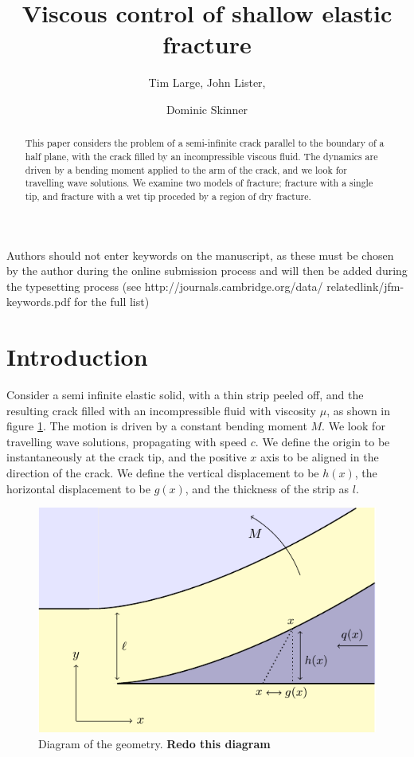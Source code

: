 \documentclass{jfm}
\title{Viscous control of shallow elastic fracture}
\author{Tim Large\aff{1},
  John Lister\aff{2},
 \and Dominic Skinner\aff{2}}
\affiliation{\aff{1} Massachusetts Institute of Technology, USA
\aff{2}Department of Applied Mathematics and Theoretical Physics, University of
Cambridge, UK}
\begin{document}
\maketitle

\begin{abstract}
This paper considers the problem of a semi-infinite crack parallel to the
boundary of a half plane, with the crack filled by an incompressible viscous
fluid. 
The dynamics are driven by a bending moment applied to the arm of the crack,
and we look for travelling wave solutions. We examine two models of fracture;
fracture with a single tip, and fracture with a wet tip proceded by a region
of dry fracture.
\end{abstract}

\begin{keywords}
Authors should not enter keywords on the manuscript, as these must be chosen by the 
author during the online submission process and will then be added during the 
typesetting process (see http://journals.cambridge.org/data/
\linebreak[3]relatedlink/jfm-\linebreak[3]keywords.pdf for the full list)
\end{keywords}

\section{Introduction}\label{sec:introduction}
Consider a semi infinite elastic solid, with a thin strip peeled off, and the
resulting crack filled with an incompressible fluid with viscosity $\mu$, as
shown in figure \ref{fig:diagram}. The
motion is driven by a constant bending moment $M$. We look for travelling wave
solutions, propagating with speed $c$. We define the origin to be 
instantaneously at the crack tip, and the positive $x$ axis to be aligned
in the direction of the crack.
We define the vertical displacement to be $h(x)$, the horizontal 
displacement to be $g(x)$, and the thickness of the strip as $l$.
%
\begin{figure}
  \centerline{\includegraphics{./../Fig1.pdf}}\label{fig:diagram}
  \caption{Diagram of the geometry. \textbf{Redo this diagram}}
           
\end{figure}
%
\end{document}
